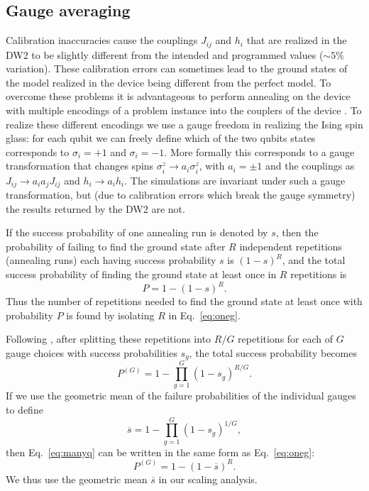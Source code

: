 \subsection{Gauge averaging}\label{subsec:gauge_averaging}
Calibration inaccuracies cause the couplings $J_{ij}$ and $h_i$ that are realized in the DW2 to be slightly different from the intended and programmed values ($\sim 5\%$ variation). These calibration errors can sometimes lead to the ground states of the model realized in the device being different from the perfect model. To overcome these problems it is advantageous to perform annealing on the device with multiple encodings of a problem instance into the couplers of the device \cite{q108}. To realize these different encodings we use a gauge freedom in realizing the Ising spin glass: for each qubit we can freely define which of the two qubits states corresponds to $\sigma_i=+1$ and  $\sigma_i=-1$. More formally this corresponds to a gauge transformation that changes spins $\sigma^z_i\rightarrow  a_i\sigma^z_i$, with $a_i=\pm1$ and the couplings as $J_{ij} \rightarrow a_ia_jJ_{ij}$ and $h_i\rightarrow a_ih_i$. The simulations are invariant under such a gauge transformation, but (due to calibration errors which break the gauge symmetry) the results returned by the DW2 are not.

If the success probability of one annealing run is denoted by $s$, then the probability of failing to find the ground state after $R$ independent repetitions (annealing runs) each having success probability $s$ is $(1-s)^R$, and the total success probability of finding the ground state at least once in $R$ repetitions is
\begin{equation}
 P=1-(1-s)^R .
 \label{eq:oneg}
 \end{equation}
Thus the number of repetitions needed to find the ground state at least once with probability $P$ is found by isolating $R$ in Eq.~\eqref{eq:oneg}.

Following \cite{q108}, after splitting these repetitions into $R/G$ repetitions for each of $G$ gauge choices with success probabilities $s_g$, the total success probability becomes
 \begin{equation}
 P^{(G)} = 1-\prod_{g=1}^G(1-s_g)^{R/G}.
 \label{eq:manyq}
 \end{equation}
If we use the geometric mean of the failure probabilities of the individual gauges to define
 \begin{equation}
\overline{s} = 1-\prod_{g=1}^G(1-s_g)^{1/G},
 \end{equation}
then Eq.~\eqref{eq:manyq} can be written in the same form as Eq.~\eqref{eq:oneg}:
\begin{equation}
 P^{(G)}=1-(1-\overline{s})^R.
 \label{eq:onegav}
 \end{equation}
We thus use the geometric mean $\overline{s}$ in our scaling analysis.\\

